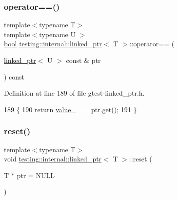 \subsubsection{\texorpdfstring{operator==()}{operator==()}\hspace{0.1cm}{\footnotesize\ttfamily [2/2]}}
{\footnotesize\ttfamily template$<$typename T$>$ \\
template$<$typename U $>$ \\
\hyperlink{classbool}{bool} \hyperlink{classtesting_1_1internal_1_1linked__ptr}{testing\+::internal\+::linked\+\_\+ptr}$<$ T $>$\+::operator== (\begin{DoxyParamCaption}\item[{\hyperlink{classtesting_1_1internal_1_1linked__ptr}{linked\+\_\+ptr}$<$ U $>$ const \&}]{ptr }\end{DoxyParamCaption}) const\hspace{0.3cm}{\ttfamily [inline]}}



Definition at line 189 of file gtest-\/linked\+\_\+ptr.\+h.


\begin{DoxyCode}
189                                                   \{
190     \textcolor{keywordflow}{return} \hyperlink{classtesting_1_1internal_1_1linked__ptr_abb52c4e944fc7a24a4ec7788b612fb37}{value\_} == ptr.get();
191   \}
\end{DoxyCode}
\mbox{\label{classtesting_1_1internal_1_1linked__ptr_a95ba3b7b66ed0193c779976c6e126ab6}} 
\subsubsection{\texorpdfstring{reset()}{reset()}}
{\footnotesize\ttfamily template$<$typename T$>$ \\
void \hyperlink{classtesting_1_1internal_1_1linked__ptr}{testing\+::internal\+::linked\+\_\+ptr}$<$ T $>$\+::reset (\begin{DoxyParamCaption}\item[{T $\ast$}]{ptr = {\ttfamily NULL} }\end{DoxyParamCaption})\hspace{0.3cm}{\ttfamily [inline]}}



